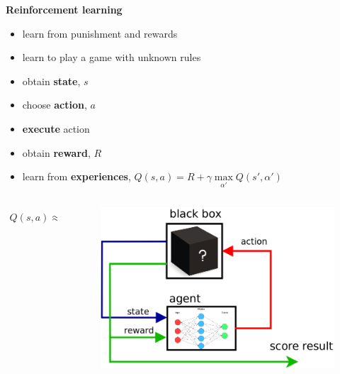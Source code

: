\documentclass[xcolor=dvipsnames]{beamer}
\begin{document}
\begin{frame}{\bf Reinforcement learning}

\begin{itemize}
  \item learn from punishment and rewards
  \item learn to play a game with unknown rules
  \item obtain {\bf state}, $s$
  \item choose {\bf action}, $a$
  \item {\bf execute} action
  \item obtain {\bf reward}, $R$
  \item learn from {\bf experiences}, $Q(s, a) = R + \gamma \max \limits_{\alpha'} Q(s', \alpha')$
\end{itemize}



\begin{columns}
\begin{column}{0.5\textwidth}

\begin{align*}
Q(s, a) \approx \hat{Q}(s, a; w)
\end{align*}

\end{column}
\begin{column}{0.5\textwidth}  %
  \begin{figure}
    \includegraphics[scale=0.28]{../../diagrams/rl_mechanism.png}
  \end{figure}
\end{column}
\end{columns}

\end{frame}
\end{document}
